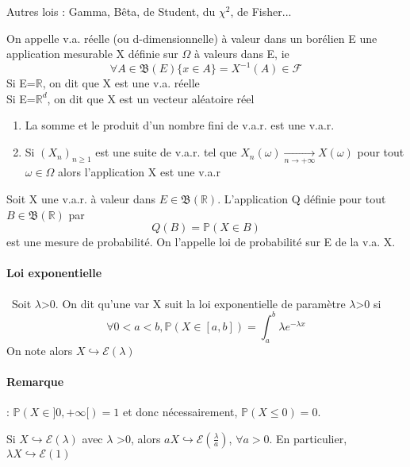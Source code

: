 Autres lois : Gamma, Bêta, de Student, du $\chi^2$, de Fisher...

\begin{Def}
On appelle v.a. réelle (ou d-dimensionnelle) à valeur dans un borélien E une application mesurable X définie sur $\Omega$ à valeurs dans E, ie \[\forall A \in \mathfrak{B}(E)\{x \in A\}=X^{-1}(A) \in \mathcal{F}\]
Si E=$\mathbb{R}$, on dit que X est une v.a. réelle \\
Si E=$\mathbb{R}^d$, on dit que X est un vecteur aléatoire réel
\end{Def}

\begin{Prop}
\begin{enumerate}
\item La somme et le produit d'un nombre fini de v.a.r. est une v.a.r.
\item Si $(X_n)_{n \geq 1}$ est une suite de v.a.r. tel que $X_n(\omega) \xrightarrow[n \rightarrow +\infty]{} X(\omega)$ pour tout $\omega \in \Omega$ alors l'application X est une v.a.r
\end{enumerate}
\end{Prop}

\begin{Def}
Soit X une v.a.r. à valeur dans $E\in \mathfrak{B}(\mathbb{R})$. L'application Q définie pour tout $B\in \mathfrak{B}(\mathbb{R})$ par \[Q(B)=\mathbb{P}(X\in B)\] est une mesure de probabilité. On l'appelle loi de probabilité sur E de la v.a. X.
\end{Def}

\paragraph{Loi exponentielle}\
Soit $\lambda$>0. On dit qu'une var X suit la loi exponentielle de paramètre $\lambda$>0 si \[\forall 0<a<b, \mathbb{P}(X\in[a,b])=\int_a^b \lambda e^{-\lambda x}\]
On note alors $X \hookrightarrow \mathcal{E}(\lambda)$

\paragraph{Remarque} : $\mathbb{P}(X\in ]0,+\infty[)=1$ et donc nécessairement, $\mathbb{P}(X\leq 0)=0$.

\begin{Prop}
Si $X\hookrightarrow \mathcal{E}(\lambda)$ avec $\lambda$ >0, alors $aX \hookrightarrow \mathcal{E}(\frac{\lambda}{a})$, $\forall a>0$.
En particulier, $\lambda X \hookrightarrow \mathcal{E}(1)$
\end{Prop}


